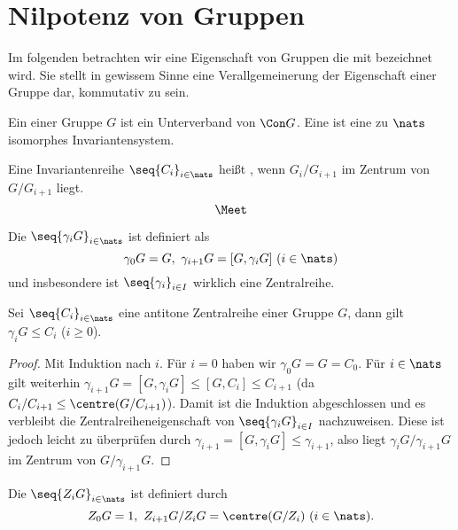 \section{Nilpotenz von Gruppen}

Im folgenden betrachten wir eine Eigenschaft von Gruppen die mit  bezeichnet wird. Sie stellt in gewissem Sinne
eine Verallgemeinerung der Eigenschaft einer Gruppe dar, kommutativ zu sein.


\begin{definition}[Invariantenfilter]
    Ein  einer Gruppe $G$ ist ein Unterverband von $\Con G$.
    Eine  ist eine zu $\nats$ isomorphes Invariantensystem.
\end{definition}

\begin{definition}[Zentralreihe]
    Eine Invariantenreihe $\seq{C_i}_{i\in\nats}$ heißt , wenn $G_i/G_{i+1}$ im Zentrum von $G/G_{i+1}$ liegt.
    $$
    \Meet
    $$
\end{definition}

\begin{definition}
    Die  $\seq{\gamma_i G}_{i\in\nats}$ ist definiert als
    $$
    \gamma_0 G= G,\ \gamma_{i+1} G = [G,\gamma_i G]\ (i\in\nats)    
    $$
    und insbesondere ist $\seq{\gamma_i}_{i\in I}$ wirklich eine Zentralreihe.
\end{definition}

\begin{lemma}
    Sei $\seq{C_i}_{i\in\nats}$ eine antitone Zentralreihe einer Gruppe $G$, dann gilt $\gamma_i G\leq C_i$ ($i\geq 0$). 
\end{lemma}
\begin{proof}
    Mit Induktion nach $i$. Für $i=0$ haben wir $\gamma_0 G= G= C_0$. 
    Für $i\in\nats$ gilt weiterhin $\gamma_{i+1} G = [G,\gamma_i G]\leq [G,C_i]\leq C_{i+1}$ (da $C_i/C_{i+1}\leq \centre
    (G/C_{i+1})$). Damit ist die Induktion abgeschlossen und es verbleibt die Zentralreiheneigenschaft von $\seq{\gamma_i G}_{i\in
        I}$ nachzuweisen.
    Diese ist jedoch leicht zu überprüfen durch $\gamma_{i+1}=[G, \gamma_i G]\leq \gamma_{i+1}$, also liegt $\gamma_i
    G/\gamma_{i+1} G$ im Zentrum von $G/\gamma_{i+1} G$.    
\end{proof}

\begin{definition}
    Die  $\seq{Z_i G}_{i\in\nats}$ ist definiert durch
    $$
    Z_0 G = 1,\ Z_{i+1} G/Z_i G = \centre (G/Z_i)\ (i\in\nats). 
    $$
\end{definition}

